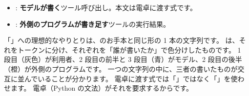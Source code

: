 \begin{itemize}
\item {}: \textbf{モデルが書く}ツール呼び出し。本文は電卓に渡す式です。
\item {}: \textbf{外側のプログラムが書き足す}ツールの実行結果。
\end{itemize}

「」への理想的なやりとりは、のお手本と同じ形の 1 本の文字列です。
は、それをトークンに分け、それぞれを「誰が書いたか」で色分けしたものです。
1 段目（灰色）が利用者、2 段目の前半と 3 段目（青）がモデル、2 段目の後半（橙）が外側のプログラムです。
一つの文字列の中に、三者の書いたものが交互に並んでいることが分かります。
電卓に渡す式では「」ではなく「\code{*}」を使わせます。
電卓（Python の文法）がそれを要求するからです。

